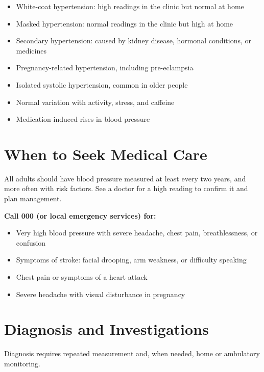 \begin{itemize}
    \item White-coat hypertension: high readings in the clinic but normal at home
    \item Masked hypertension: normal readings in the clinic but high at home
    \item Secondary hypertension: caused by kidney disease, hormonal conditions, or medicines
    \item Pregnancy-related hypertension, including pre-eclampsia
    \item Isolated systolic hypertension, common in older people
    \item Normal variation with activity, stress, and caffeine
    \item Medication-induced rises in blood pressure
\end{itemize}

\section*{When to Seek Medical Care}
All adults should have blood pressure measured at least every two years, and more often with risk factors. See a doctor for a high reading to confirm it and plan management.

\textbf{Call 000 (or local emergency services) for:}
\begin{itemize}
    \item Very high blood pressure with severe headache, chest pain, breathlessness, or confusion
    \item Symptoms of stroke: facial drooping, arm weakness, or difficulty speaking
    \item Chest pain or symptoms of a heart attack
    \item Severe headache with visual disturbance in pregnancy
\end{itemize}

\section*{Diagnosis and Investigations}
Diagnosis requires repeated measurement and, when needed, home or ambulatory monitoring.

